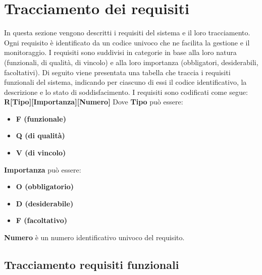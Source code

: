 \section{Tracciamento dei requisiti}
In questa sezione vengono descritti i requisiti del sistema e il loro tracciamento. Ogni requisito è identificato da un codice univoco che ne facilita la gestione e il monitoraggio. I requisiti sono suddivisi in categorie in base alla loro natura (funzionali, di qualità, di vincolo) e alla loro importanza
(obbligatori, desiderabili, facoltativi). Di seguito viene presentata una tabella che traccia i requisiti funzionali del sistema, indicando per ciascuno di essi il codice identificativo, la descrizione e lo stato di soddisfacimento.
\newline I requisiti sono codificati come segue: \textbf{R[Tipo][Importanza][Numero]}
\newline
Dove \textbf{Tipo} può essere:
\begin{itemize}
	\item \textbf{F (funzionale)}
	\item \textbf{Q (di qualità)}
	\item \textbf{V (di vincolo)}
\end{itemize}
\textbf{Importanza} può essere:
\begin{itemize}
	\item \textbf{O (obbligatorio)}
	\item \textbf{D (desiderabile)}
	\item \textbf{F (facoltativo)}
\end{itemize}
\textbf{Numero} è un numero identificativo univoco del requisito.

\subsection{Tracciamento requisiti funzionali}

